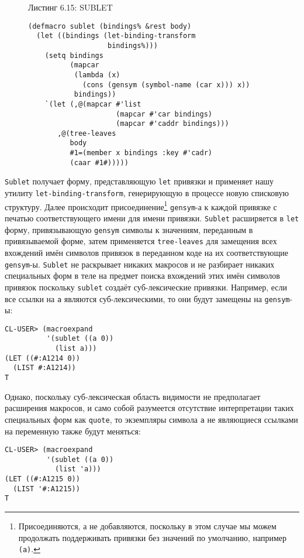 \begin{figure}Листинг 6.15: SUBLET\label{listing_6.15}
\listbegin
\begin{verbatim}
(defmacro sublet (bindings% &rest body)
  (let ((bindings (let-binding-transform
                   bindings%)))
    (setq bindings
          (mapcar
           (lambda (x)
             (cons (gensym (symbol-name (car x))) x))
           bindings))
    `(let (,@(mapcar #'list
                     (mapcar #'car bindings)
                     (mapcar #'caddr bindings)))
       ,@(tree-leaves
          body
          #1=(member x bindings :key #'cadr)
          (caar #1#)))))
\end{verbatim}
\listend
\end{figure}

\verb"Sublet" получает форму, представляющую \verb"let" привязки и применяет нашу утилиту \verb"let-binding-transform", генерирующую в процессе новую списковую структуру. Далее происходит присоединение\footnote{Присоединяются, а не добавляются, поскольку в этом случае мы можем продолжать поддерживать привязки без значений по умолчанию, например \verb"(a)".} \verb"gensym"-а к каждой привязке с печатью соответствующего имени для имени привязки. \verb"Sublet" расширяется в \verb"let" форму, привязывающую \verb"gensym" символы к значениям, переданным в привязываемой форме, затем применяется \verb"tree-leaves" для замещения всех вхождений имён символов привязок в переданном коде на их соответствующие \verb"gensym"-ы. \verb"Sublet" не раскрывает никаких макросов и не разбирает никаких специальных форм в теле на предмет поиска вхождений этих имён символов привязок поскольку \verb"sublet" создаёт суб-лексические привязки. Например, если все ссылки на \verb"a" являются суб-лексическими, то они будут замещены на \verb"gensym"-ы:



\begin{verbatim}
CL-USER> (macroexpand
          '(sublet ((a 0))
            (list a)))
(LET ((#:A1214 0))
  (LIST #:A1214))
T
\end{verbatim}

Однако, поскольку суб-лексическая область видимости не предполагает расширения макросов, и само собой разумеется отсутствие интерпретации таких специальных форм как \verb"quote", то экземпляры символа \verb"a" не являющиеся ссылками на переменную также будут меняться:

\begin{verbatim}
CL-USER> (macroexpand
          '(sublet ((a 0))
            (list 'a)))
(LET ((#:A1215 0))
  (LIST '#:A1215))
T
\end{verbatim}

